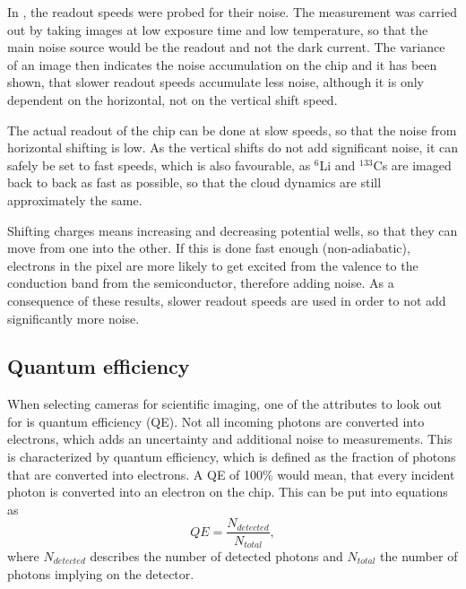 
In , the readout speeds were probed for their noise. The measurement was carried out by taking images at low exposure time and low temperature, so that the main noise source would be the readout and not the dark current. The variance of an image then indicates the noise accumulation on the chip and it has been shown, that slower readout speeds accumulate less noise, although it is only dependent on the horizontal, not on the vertical shift speed.

The actual readout of the chip can be done at slow speeds, so that the noise from horizontal shifting is low. As the vertical shifts do not add significant noise, it can safely be set to fast speeds, which is also favourable, as $^6$Li and $^{133}$Cs are imaged back to back as fast as possible, so that the cloud dynamics are still approximately the same.

Shifting charges means increasing and decreasing potential wells, so that they can move from one into the other. If this is done fast enough (non-adiabatic), electrons in the pixel are more likely to get excited from the valence to the conduction band from the semiconductor, therefore adding noise. As a consequence of these results, slower readout speeds are used in order to not add significantly more noise.


\newpage
\subsection{Quantum efficiency}
\label{ch:quantumeff}
When selecting cameras for scientific imaging, one of the attributes to look out for is quantum efficiency (QE). Not all incoming photons are converted into electrons, which adds an uncertainty and additional noise to measurements. This is characterized by quantum efficiency, which is defined as the fraction of photons that are converted into electrons. A  QE of 100\% would mean, that every incident photon is converted into an electron on the chip. This can be put into equations as
\begin{equation}
QE = \frac{N_{detected}}{N_{total}},
\end{equation}
where $N_{detected}$ describes the number of detected photons and $N_{total}$ the number of photons implying on the detector.

